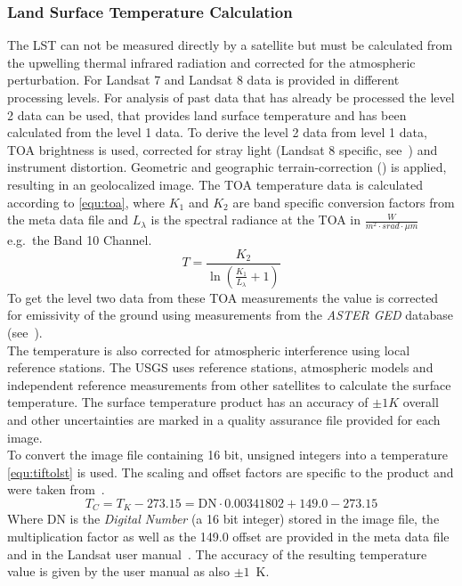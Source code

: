 \documentclass[12pt,a4paper, english,twoside]{scrartcl}
\begin{document}
    \subsubsection{Land Surface Temperature Calculation}\label{sec:lstcalc}
      The \gls{LST} can not be measured directly by a satellite but must be calculated from the upwelling thermal infrared radiation and corrected for the atmospheric perturbation. 
      For Landsat 7 and Landsat 8 data is provided in different processing levels.
      For analysis of past data that has already be processed the level 2 data can be used, that provides land surface temperature and has been calculated from the level 1 data. 
      To derive the level 2 data from level 1 data, \gls{TOA} brightness is used, corrected for stray light (Landsat 8 specific, see~\autocite[p.~67]{Zanter2019}) and instrument distortion. 
      Geometric and geographic terrain-correction (\cite[p.~44]{Zanter2019}) is applied, resulting in an geolocalized image.
      The \gls{TOA} temperature data is calculated according to \cref{equ:toa}, where $K_1$ and $K_2$ are band specific conversion factors from the meta data file and $L_\lambda$ is the spectral radiance at the \gls{TOA} in $\frac{W}{m^2\cdot srad \cdot \mu m}$ e.g.\ the Band 10 Channel. 
      \begin{equation}\label{equ:toa}
  	    T = \frac{K_2}{\ln\left(\frac{K_1}{L_{\lambda}}+1\right)}
      \end{equation}
      To get the level two data from these \gls{TOA} measurements the value is corrected for emissivity of the ground using measurements from the \textit{ASTER GED} database (see~\cite{USGSWebsite}).\\
      The temperature is also corrected for atmospheric interference using local reference stations. 
      The \gls{USGS} uses reference stations, atmospheric models and independent reference measurements from other satellites to calculate the surface temperature. 
      The surface temperature product has an accuracy of $\pm 1 K$ overall and other uncertainties are marked in a quality assurance file provided for each image.\\
      To convert the image file containing 16 bit, unsigned integers into a temperature \cref{equ:tiftolst} is used. The scaling and offset factors are specific to the product and were taken from~\cite[Table 6-1]{EROASC2013}.
      \begin{equation}\label{equ:tiftolst}
        T_C = T_K - 273.15 = \text{DN} \cdot 0.00341802 + 149.0 - 273.15 
      \end{equation}
      Where DN is the \textit{Digital Number} (a 16 bit integer) stored in the image file, the multiplication factor as well as the 149.0 offset are provided in the meta data file and in the Landsat user manual~\autocite{EROASC2013}. 
      The accuracy of the resulting temperature value is given by the user manual as also $\pm 1$~K.
\end{document}
